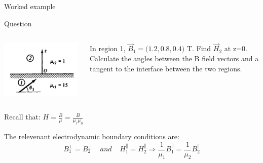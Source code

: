 {
\problemslide

%
%
%

\begin{frame}{Worked example}

\begin{blockexmplque}{Question}
\begin{columns}
  \begin{column}{0.25\textwidth}
   \begin{center}
     \includegraphics[width=0.98\textwidth]{./images/problems/lect8_boundary.png}
   \end{center}
  \end{column}
  \begin{column}{0.75\textwidth}
     In region 1, $\displaystyle \vec{B}_1 = \Big(1.2, 0.8, 0.4 \Big)$ T.
     Find $\vec{H}_2$ at z=0. \\
     Calculate the angles between the B field vectors and a tangent to the
     interface between the two regions.
  \end{column}
\end{columns}

\end{blockexmplque}

\vspace{0.2cm}

Recall that: $\displaystyle H = \frac{B}{\mu} = \frac{B}{\mu_r \mu_0}$

\vspace{0.4cm}

The relevenant electrodynamic boundary conditions are:
\begin{equation*}
  B_1^{\perp} = B_2^{\perp} \;\;\;\; and \;\;\;\;
  H_1^{\parallel} = H_2^{\parallel} \Rightarrow  \frac{1}{\mu_1}  B_1^{\parallel} = \frac{1}{\mu_2} B_2^{\parallel}
\end{equation*}


\end{frame}}
